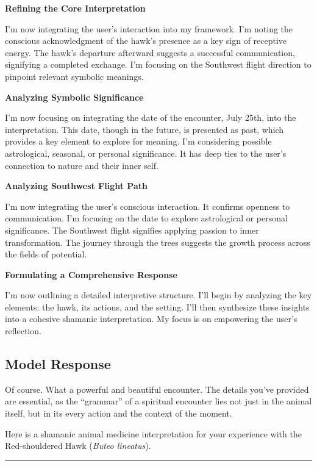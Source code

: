 \documentclass{article}
\begin{document}
\textbf{Refining the Core Interpretation}

I'm now integrating the user's interaction into my framework. I'm noting the conscious acknowledgment of the hawk's presence as a key sign of receptive energy. The hawk's departure afterward suggests a successful communication, signifying a completed exchange. I'm focusing on the Southwest flight direction to pinpoint relevant symbolic meanings.

\textbf{Analyzing Symbolic Significance}

I'm now focusing on integrating the date of the encounter, July 25th, into the interpretation. This date, though in the future, is presented as past, which provides a key element to explore for meaning. I'm considering possible astrological, seasonal, or personal significance. It has deep ties to the user's connection to nature and their inner self.

\textbf{Analyzing Southwest Flight Path}

I'm now integrating the user's conscious interaction. It confirms openness to communication. I'm focusing on the date to explore astrological or personal significance. The Southwest flight signifies applying passion to inner transformation. The journey through the trees suggests the growth process across the fields of potential.

\textbf{Formulating a Comprehensive Response}

I'm now outlining a detailed interpretive structure. I'll begin by analyzing the key elements: the hawk, its actions, and the setting. I'll then synthesize these insights into a cohesive shamanic interpretation. My focus is on empowering the user's reflection.

\subsection*{Model Response}\label{model-response}

Of course. What a powerful and beautiful encounter. The details you've provided are essential, as the ``grammar'' of a spiritual encounter lies not just in the animal itself, but in its every action and the context of the moment.

Here is a shamanic animal medicine interpretation for your experience with the Red-shouldered Hawk (\emph{Buteo lineatus}).

\begin{center}\rule{0.5\linewidth}{0.5pt}\end{center}
\end{document}
